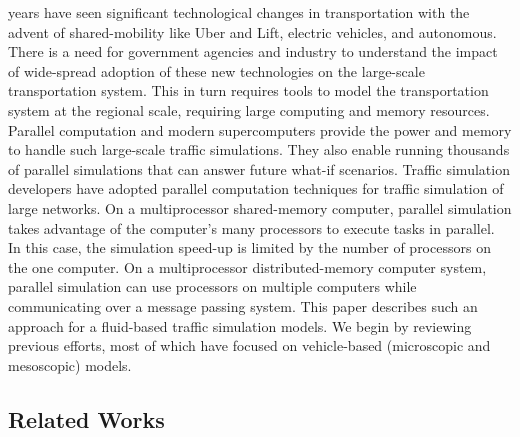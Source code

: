  years have seen significant technological changes in transportation with the advent of shared-mobility like Uber and Lift, electric vehicles, and autonomous. There is a need for government agencies and industry to understand the impact of wide-spread adoption of these new technologies on the large-scale transportation system. This in turn requires tools to model the transportation system at the regional scale, requiring large computing and memory resources. Parallel computation and modern supercomputers provide the power and memory to handle such large-scale traffic simulations. They also enable running thousands of parallel simulations that can answer future what-if scenarios.
Traffic simulation developers have adopted parallel computation techniques for traffic simulation of large networks. On a multiprocessor shared-memory computer, parallel simulation takes advantage of the computer's many processors to execute tasks in parallel. In this case, the simulation speed-up is limited by the number of processors on the one computer. On a multiprocessor distributed-memory computer system, parallel simulation can use processors on multiple computers while communicating over a message passing system. This paper describes such an approach for a fluid-based traffic simulation models. We begin by reviewing previous efforts, most of which have focused on vehicle-based (microscopic and mesoscopic) models. 


\subsection{Related Works}

